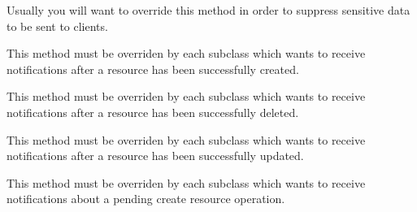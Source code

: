 \documentclass[letterpaper,10pt,english]{sphinxmanual}
\begin{document}
\begin{fulllineitems}
\begin{fulllineitems}
Usually you will want to override this method in order to suppress sensitive data to be sent to clients.

\end{fulllineitems}


\begin{fulllineitems}
\label{features/roa/technical_summary:fantastico.roa.resource_validator.ResourceValidator.on_post_create}
This method must be overriden by each subclass which wants to receive notifications after a resource 
has been successfully created.

\end{fulllineitems}


\begin{fulllineitems}
\label{features/roa/technical_summary:fantastico.roa.resource_validator.ResourceValidator.on_post_delete}
This method must be overriden by each subclass which wants to receive notifications after a resource 
has been successfully deleted.

\end{fulllineitems}


\begin{fulllineitems}
\label{features/roa/technical_summary:fantastico.roa.resource_validator.ResourceValidator.on_post_update}
This method must be overriden by each subclass which wants to receive notifications after a resource 
has been successfully updated.

\end{fulllineitems}


\begin{fulllineitems}
\label{features/roa/technical_summary:fantastico.roa.resource_validator.ResourceValidator.on_pre_create}
This method must be overriden by each subclass which wants to receive notifications about a pending
create resource operation.


\end{fulllineitems}
\end{fulllineitems}
\end{document}
